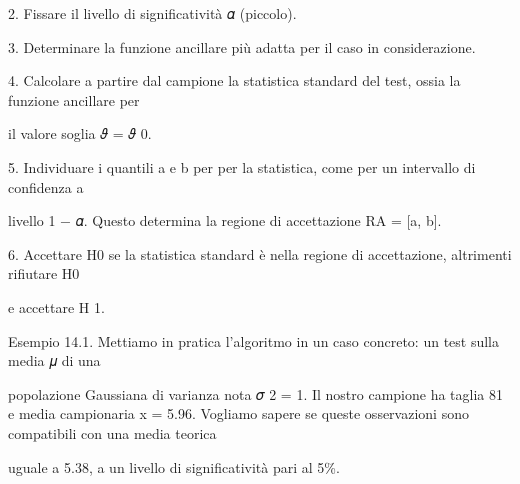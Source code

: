 \documentclass[a4paper,portrait,12pt]{article}
\begin{document}
\begin{flushleft}
2. Fissare il livello di significativit\`{a} 𝛼 (piccolo).
\end{flushleft}


\begin{flushleft}
3. Determinare la funzione ancillare più adatta per il caso in considerazione.
\end{flushleft}


\begin{flushleft}
4. Calcolare a partire dal campione la statistica standard del test, ossia la funzione ancillare per
\end{flushleft}


\begin{flushleft}
il valore soglia 𝜗 = 𝜗 0.
\end{flushleft}


\begin{flushleft}
5. Individuare i quantili a e b per per la statistica, come per un intervallo di confidenza a
\end{flushleft}


\begin{flushleft}
livello 1 $-$ 𝛼. Questo determina la regione di accettazione RA = [a, b].
\end{flushleft}


\begin{flushleft}
6. Accettare H0 se la statistica standard \`{e} nella regione di accettazione, altrimenti rifiutare H0
\end{flushleft}


\begin{flushleft}
e accettare H 1.
\end{flushleft}


\begin{flushleft}
Esempio 14.1. Mettiamo in pratica l'algoritmo in un caso concreto: un test sulla media 𝜇 di una
\end{flushleft}


\begin{flushleft}
popolazione Gaussiana di varianza nota 𝜎 2 = 1. Il nostro campione ha taglia 81 e media campionaria x = 5.96. Vogliamo sapere se queste osservazioni sono compatibili con una media teorica
\end{flushleft}


\begin{flushleft}
uguale a 5.38, a un livello di significativit\`{a} pari al 5\%.
\end{flushleft}
\end{document}
